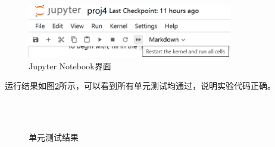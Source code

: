 \begin{figure}[H]
    \centering
    \includegraphics[width=0.8\textwidth]{pics/jupyter.png}
    \caption{Jupyter Notebook界面}
    \label{fig:jupyter}
\end{figure}

运行结果如图\ref{fig:unit_test}所示，可以看到所有单元测试均通过，说明实验代码正确。

\begin{figure}[H]
    \centering
     \\
     \\
    \caption{单元测试结果}
    \label{fig:unit_test}
\end{figure}